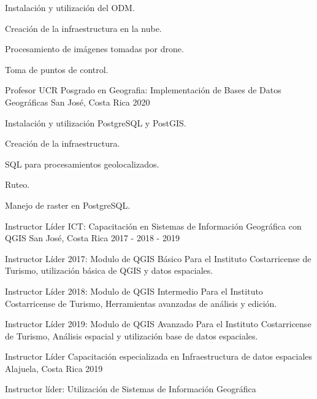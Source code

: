 \begin{cventries}
{\begin{cvitems}
      \item Instalación y utilización del ODM.
      \item Creación de la infraestructura en la nube.
      \item Procesamiento de imágenes tomadas por drone.
      \item Toma de puntos de control.
    \end{cvitems}
  }
   \cventry
   {Profesor} %
   {UCR Posgrado en Geografia: Implementación de Bases de Datos Geográficas} %
   {San José, Costa Rica} %
   {2020} %
   {
     \begin{cvitems} %
       \item Instalación y utilización PostgreSQL y PostGIS.
       \item Creación de la infraestructura.
       \item SQL para procesamientos geolocalizados.
       \item Ruteo.
       \item Manejo de raster en PostgreSQL.
     \end{cvitems}
   }
  \cventry
  {Instructor Líder} %
  {ICT: Capacitación en Sistemas de Información Geográfica con QGIS} %
  {San José, Costa Rica} %
  {2017 - 2018 - 2019} %
  {
    \begin{cvitems} %
      \item Instructor Líder 2017: Modulo de QGIS Básico Para el Instituto
      Costarricense de Turismo, utilización básica de QGIS y datos
      espaciales.
      \item Instructor Líder 2018: Modulo de QGIS Intermedio Para el
      Instituto Costarricense de Turismo, Herramientas avanzadas de análisis
      y edición.
      \item Instructor Líder 2019: Modulo de QGIS Avanzado Para el Instituto
      Costarricense de Turismo, Análisis espacial y utilización base de datos
      espaciales.
    \end{cvitems}
  }
  \cventry
  {Instructor Líder} %
  {Capacitación especializada en Infraestructura de datos espaciales} %
  {Alajuela, Costa Rica} %
  {2019} %
  {
    \begin{cvitems} %
      \item Instructor líder: Utilización de Sistemas de Información Geográfica

\end{cvitems}}
\end{cventries}
